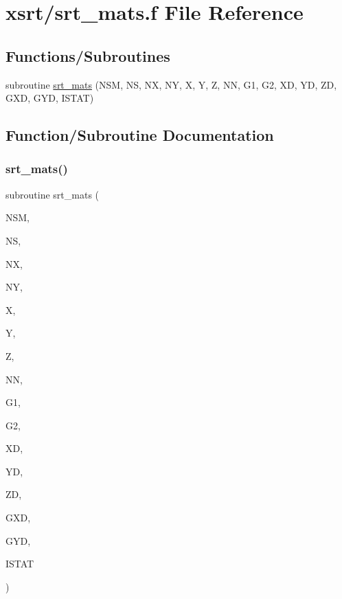 \hypertarget{srt__mats_8f}{}\section{xsrt/srt\+\_\+mats.f File Reference}
\label{srt__mats_8f}
\subsection*{Functions/\+Subroutines}
\begin{DoxyCompactItemize}
\item 
subroutine \hyperlink{srt__mats_8f_a8e4a2892be81418418b1552d992e5db9}{srt\+\_\+mats} (N\+SM, NS, NX, NY, X, Y, Z, NN, G1, G2, XD, YD, ZD, G\+XD, G\+YD, I\+S\+T\+AT)
\end{DoxyCompactItemize}


\subsection{Function/\+Subroutine Documentation}
\mbox{\label{srt__mats_8f_a8e4a2892be81418418b1552d992e5db9}} 
\subsubsection{\texorpdfstring{srt\+\_\+mats()}{srt\_mats()}}
{\footnotesize\ttfamily subroutine srt\+\_\+mats (\begin{DoxyParamCaption}\item[{integer}]{N\+SM,  }\item[{integer}]{NS,  }\item[{integer}]{NX,  }\item[{integer}]{NY,  }\item[{double precision, dimension(nx)}]{X,  }\item[{double precision, dimension(ny)}]{Y,  }\item[{double precision, dimension(nx,ny)}]{Z,  }\item[{integer}]{NN,  }\item[{double precision, dimension(nn)}]{G1,  }\item[{double precision, dimension(nn)}]{G2,  }\item[{double precision, dimension(nx,nsm)}]{XD,  }\item[{double precision, dimension(ny,nsm)}]{YD,  }\item[{double precision, dimension(nx,ny,nsm)}]{ZD,  }\item[{double precision, dimension(nx,ny,nsm)}]{G\+XD,  }\item[{double precision, dimension(nx,ny,nsm)}]{G\+YD,  }\item[{integer}]{I\+S\+T\+AT }\end{DoxyParamCaption})}

